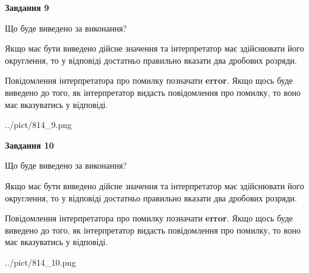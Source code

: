 \documentclass[12pt, ukrainian]{article}
\begin{document}
{\begin {Large}
{\begin {center}\textbf{Завдання 9}\end {center}}\par
Що буде виведено за виконання? \par

Якщо має бути виведено дійсне значення та інтерпретатор має здійснювати його округлення, 
то у відповіді достатньо правильно вказати два дробових розряди.

Повідомлення інтерпретатора про помилку позначати \textbf{error}.
Якщо щось буде виведено до того, як інтерпретатор видасть повідомлення про помилку, 
то воно має вказуватись у відповіді. \par

\begin{center}
	{../pict/814_9.png}
\end{center}
\newpage

{\begin {center}\textbf{Завдання 10}\end {center}}\par
Що буде виведено за виконання? \par

Якщо має бути виведено дійсне значення та інтерпретатор має здійснювати його округлення, 
то у відповіді достатньо правильно вказати два дробових розряди.

Повідомлення інтерпретатора про помилку позначати \textbf{error}.
Якщо щось буде виведено до того, як інтерпретатор видасть повідомлення про помилку, 
то воно має вказуватись у відповіді. \par

\begin{center}
	{../pict/814_10.png}
\end{center}
\newpage

\end {Large}}
\end{document}
